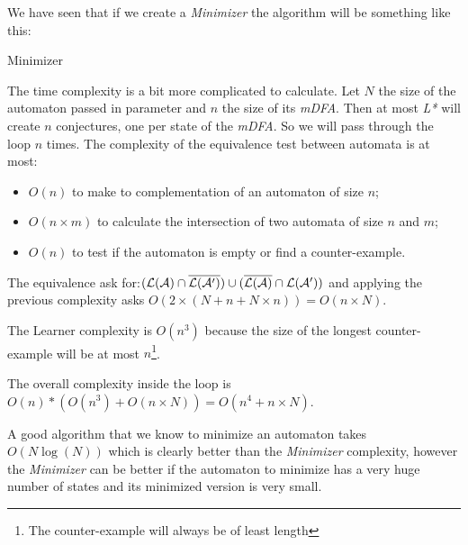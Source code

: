 We have seen that if we create a \textit{Minimizer} the algorithm will be something like this:

\begin{algorithm}[h]
  \caption{Minimizer}

\end{algorithm}



The time complexity is a bit more complicated to calculate. Let $N$ the size of the automaton passed in parameter and $n$ the size of its \textit{mDFA}. Then at most \textit{L*} will create $n$ conjectures, one per state of the \textit{mDFA}. So we will pass through the loop $n$ times. The complexity of the equivalence test between automata is at most:
\begin{itemize}
  \item $O(n)$ to make to complementation of an automaton of size $n$;
  \item $O(n \times m)$ to calculate the intersection of two automata of size $n$ and $m$;
  \item $O(n)$ to test if the automaton is empty or find a counter-example.
\end{itemize}
The equivalence ask for:$(\mathcal{L}(\mathcal{A}) \cap \overline{\mathcal{L}(\mathcal{A}')}) \cup (\overline{\mathcal{L}(\mathcal{A})} \cap \mathcal{L}(\mathcal{A}'))$ and applying the previous complexity asks $O(2 \times (N + n + N \times n)) = O(n \times N)$.

The Learner complexity is $O(n^3)$ because the size of the longest counter-example will be at most $n$\footnote{The counter-example will always be of least length}.

The overall complexity inside the loop is $O(n)*(O(n^3) + O(n \times N)) = O(n^4 + n \times N)$.

A good algorithm that we know to minimize an automaton takes $O(N \log(N))$ which is clearly better than the \textit{Minimizer} complexity, however the \textit{Minimizer} can be better if the automaton to minimize has a very huge number of states and its minimized version is very small.


